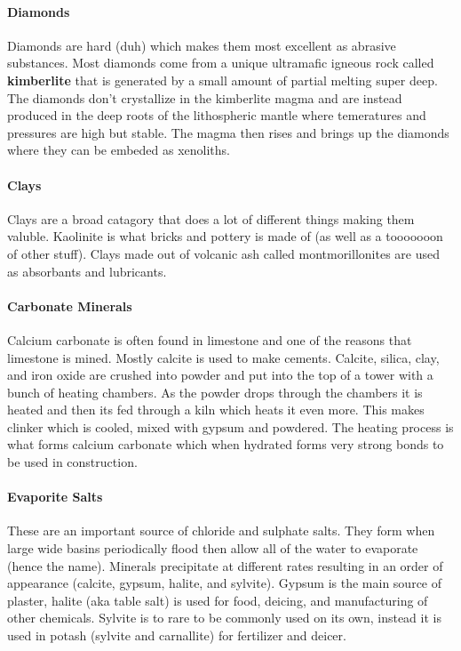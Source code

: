 \documentclass{article}
\begin{document}
\paragraph{Diamonds} %
\label{par:diamonds}
Diamonds are hard (duh) which makes them most excellent as abrasive substances. Most diamonds come from a unique ultramafic igneous rock called \textbf{kimberlite} that is generated by a small amount of partial melting super deep. The diamonds don't crystallize in the kimberlite magma and are instead produced in the deep roots of the lithospheric mantle where temeratures and pressures are high but stable. The magma then rises and brings up the diamonds where they can be embeded as xenoliths.

\paragraph{Clays} %
\label{par:clays}
Clays are a broad catagory that does a lot of different things making them valuble. Kaolinite is what bricks and pottery is made of (as well as a tooooooon of other stuff). Clays made out of volcanic ash called montmorillonites are used as absorbants and lubricants.

\paragraph{Carbonate Minerals} %
\label{par:carbonate_minerals}
Calcium carbonate is often found in limestone and one of the reasons that limestone is mined. Mostly calcite is used to make cements. Calcite, silica, clay, and iron oxide are crushed into powder and put into the top of a tower with a bunch of heating chambers. As the powder drops through the chambers it is heated and then its fed through a kiln which heats it even more. This makes clinker which is cooled, mixed with gypsum and powdered. The heating process is what forms calcium carbonate which when hydrated forms very strong bonds to be used in construction.

\paragraph{Evaporite Salts} %
\label{par:evaporite_salts}
These are an important source of chloride and sulphate salts. They form when large wide basins periodically flood then allow all of the water to evaporate (hence the name). Minerals precipitate at different rates resulting in an order of appearance (calcite, gypsum, halite, and sylvite). Gypsum is the main source of plaster, halite (aka table salt) is used for food, deicing, and manufacturing of other chemicals. Sylvite is to rare to be commonly used on its own, instead it is used in potash (sylvite and carnallite) for fertilizer and deicer.
\end{document}
